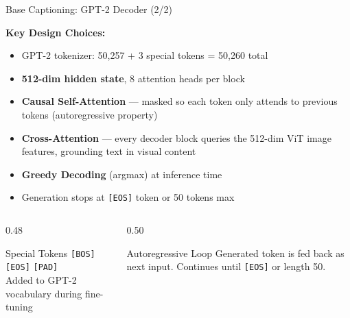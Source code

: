 \documentclass{beamer}
\begin{document}
\begin{frame}{Base Captioning: GPT-2 Decoder (2/2)}

    \textbf{Key Design Choices:}\\[0.5em]
    \begin{itemize}
        \item GPT-2 tokenizer: 50,257 + 3 special tokens = 50,260 total
        \item \textbf{512-dim hidden state}, 8 attention heads per block
        \item \textbf{Causal Self-Attention} — masked so each token only attends to previous tokens (autoregressive property)
        \item \textbf{Cross-Attention} — every decoder block queries the 512-dim ViT image features, grounding text in visual content
        \item \textbf{Greedy Decoding} (argmax) at inference time
        \item Generation stops at \texttt{[EOS]} token or 50 tokens max
    \end{itemize}

    \vspace{0.4cm}
    \begin{columns}[T]
    \begin{column}{0.48\textwidth}
        \begin{block}{Special Tokens}
            \centering
            \texttt{[BOS]} \quad \texttt{[EOS]} \quad \texttt{[PAD]}\\
            \small Added to GPT-2 vocabulary during fine-tuning
        \end{block}
    \end{column}
    \begin{column}{0.50\textwidth}
        \begin{alertblock}{Autoregressive Loop}
            \small Generated token is fed back as next input. Continues until \texttt{[EOS]} or length 50.
        \end{alertblock}
    \end{column}
    \end{columns}

\end{frame}
\end{document}
